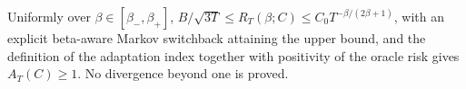 Uniformly over \(\beta\in[\beta_-,\beta_+]\), \(B/\sqrt{3T}\le R_T(\beta;C)\le C_0T^{-\beta/(2\beta+1)}\), with an explicit beta-aware Markov switchback attaining the upper bound, and the definition of the adaptation index together with positivity of the oracle risk gives \(A_T(C)\ge1\). No divergence beyond one is proved.